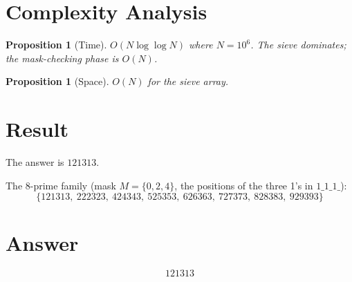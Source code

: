 \documentclass[12pt]{article}
\newtheorem{proposition}[theorem]{Proposition}
\theoremstyle{definition}
\begin{document}
\section{Complexity Analysis}

\begin{proposition}[Time]
$O(N \log \log N)$ where $N = 10^6$. The sieve dominates; the mask-checking phase is $O(N)$.
\end{proposition}

\begin{proposition}[Space]
$O(N)$ for the sieve array.
\end{proposition}

\section{Result}

The answer is $\boxed{121313}$.

The 8-prime family (mask $M = \{0, 2, 4\}$, the positions of the three 1's in $1\_1\_1\_$):
\[
\{121313,\ 222323,\ 424343,\ 525353,\ 626363,\ 727373,\ 828383,\ 929393\}
\]

\section{Answer}

\[
\boxed{121313}
\]
\end{document}
